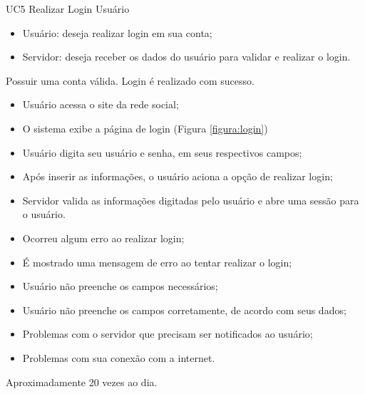 \casoDeUso
{UC5}
{Realizar Login}
{Usuário}
{
\begin{itemize}
	\item Usuário: deseja realizar login em sua conta;
	\item Servidor: deseja receber os dados do usuário para validar e realizar o login.
\end{itemize}

}
{Possuir uma conta válida.}
{Login é realizado com sucesso.}
{
\begin{itemize}
\item Usuário acessa o site da rede social;
\item O sistema exibe a página de login (Figura \ref{figura:login})
\item Usuário digita seu usuário e senha, em seus respectivos campos;
\item Após inserir as informações, o usuário aciona a opção de realizar login;
\item Servidor valida as informações digitadas pelo usuário e abre uma sessão para o usuário.
\end{itemize}
}
{
\begin{itemize}
\item Ocorreu algum erro ao realizar login;
\item É mostrado uma mensagem de erro ao tentar realizar o login;
\item Usuário não preenche os campos necessários;
\item Usuário não preenche os campos corretamente, de acordo com seus dados;
\item Problemas com o servidor que precisam ser notificados ao usuário;
\item Problemas com sua conexão com a internet.
\end{itemize}
}
{Aproximadamente 20 vezes ao dia.}
{

}

